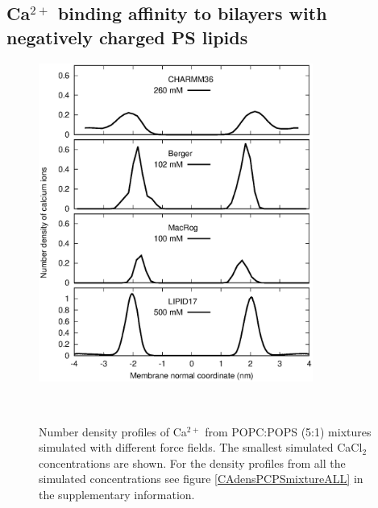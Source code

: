 \documentclass[aps,prl,superscriptaddress,twocolumn]{revtex4}
\begin{document}
\subsection{Ca$^{2+}$ binding affinity to bilayers with negatively charged PS lipids}
\begin{figure}[tb]
  \centering
  \includegraphics[width=9cm]{../Figs/CAdensPCPSmixtureLOWcons.eps}
  \caption{\label{CAdensPCPSmixture}
    Number density profiles of Ca$^{2+}$ from POPC:POPS (5:1) mixtures simulated with different force fields.
    The smallest simulated CaCl$_2$ concentrations are shown.
    For the density profiles from all the simulated concentrations see figure \ref{CAdensPCPSmixtureALL}
    in the supplementary information.
  }
   \\
\end{figure}
\end{document}
